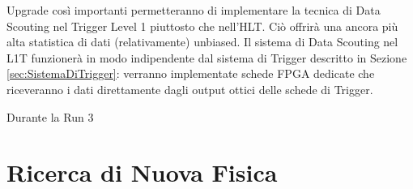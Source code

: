 Upgrade così importanti permetteranno di implementare la tecnica di Data Scouting nel Trigger Level 1 piuttosto che nell'HLT. Ciò offrirà una ancora più alta statistica di dati (relativamente) unbiased.\newline
Il sistema di Data Scouting nel L1T funzionerà in modo indipendente dal sistema di Trigger descritto in Sezione \ref{sec:SistemaDiTrigger}: verranno implementate schede FPGA dedicate che riceveranno i dati direttamente dagli output ottici delle schede di Trigger.

Durante la Run 3


\section{Ricerca di Nuova Fisica}
\label{sec:NewPhysics}

